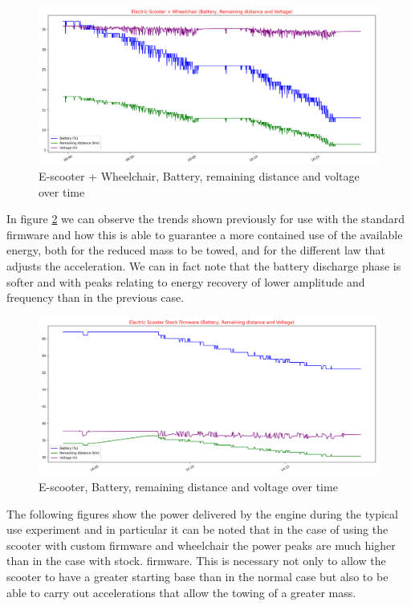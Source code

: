 \documentclass[binding=0.6cm,LaM,noexaminfo]{sapthesis}
\begin{document}
\begin{figure}[!htp]
    \centering
    \includegraphics[width=.9\textwidth]{images/graphs/1_batt+dist+volt.png}
    \caption{E-scooter + Wheelchair,  Battery, remaining distance and voltage over time}
    \label{fig:1_batt&dist&volt}
\end{figure}

\newpage
\noindent In figure \ref{fig:2_batt&dist&volt} we can observe the trends shown previously for use with the standard firmware and how this is able to guarantee a more contained use of the available energy, both for the reduced mass to be towed, and for the different law that adjusts the acceleration. We can in fact note that the battery discharge phase is softer and with peaks relating to energy recovery of lower amplitude and frequency than in the previous case.

\begin{figure}[!htp]
    \centering
    \includegraphics[width=\textwidth]{images/graphs/2_batt+dist+volt.png}
    \caption{E-scooter,  Battery, remaining distance and voltage over time}
    \label{fig:2_batt&dist&volt}
\end{figure}

\noindent The following figures show the power delivered by the engine during the typical use experiment and in particular it can be noted that in the case of using the scooter with custom firmware and wheelchair the power peaks are much higher than in the case with stock. firmware. This is necessary not only to allow the scooter to have a greater starting base than in the normal case but also to be able to carry out accelerations that allow the towing of a greater mass. 
\end{document}
